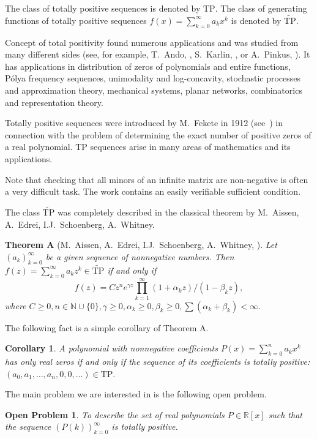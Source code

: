 \documentclass[12pt]{amsart}
\newcounter{count}
\numberwithin{count}{section}
\newtheorem{Corollary}[count]{Corollary}
\newtheorem{Problem}[count]{Open Problem}
\begin{document}
The class of totally positive sequences is denoted by $\mathrm{TP}.$
The class of generating functions of totally positive sequences
$f(x)=\sum_{k=0}^\infty a_k x^k$
is  denoted by  $\widetilde{\mathrm{TP}}.$

Concept of total positivity found numerous applications and was
studied from many different sides (see, for example, T.~Ando, \cite{ando}, 
S.~Karlin,  \cite{tp},  or A.~Pinkus, \cite{pin}).  It has applications  
in distribution of zeros of polynomials and entire functions,  P\'olya 
frequency sequences, unimodality and log-concavity,  stochastic 
processes and approximation theory, mechanical systems,  planar  
networks, combinatorics and representation theory. 


Totally  positive  sequences were introduced
by M.~Fekete in 1912 (see~\cite{fek}) in connection with the problem 
of determining the exact number of positive zeros of a real polynomial. 
$\mathrm{TP}$  sequences arise in many areas of mathematics and its
applications.

Note that checking that all minors of an infinite matrix are non-negative is 
often a very difficult task. The work \cite{kv} contains an easily verifiable 
sufficient condition.

The class $\widetilde{\mathrm{TP}}$ was completely described in the
classical theorem by M.~Aissen, A.~Edrei, I.J.~Schoenberg, A.~Whitney.  

 

{\bf  Theorem A} (M.~Aissen, A.~Edrei, I.J.~Schoenberg, A.~Whitney, \cite{aissen}).
{ \it  Let $(a_k)_{k=0}^\infty$  be a given sequence of nonnegative numbers.  
Then $f(z)=\sum_{k=0}^\infty a_kz^k \in \widetilde{\mathrm{TP}}$ if and
only if
$$f(z)=C z^n e^{\gamma z}\prod_{k=1}^\infty (1+\alpha_kz)/(1-\beta_kz),$$
where $C\ge 0, n\in \mathbb{ N}\cup\{0\},
\gamma\ge0,\alpha_k\ge0,\beta_k\ge0,\sum(\alpha_k+\beta_k)
<\infty.$}

The following fact is a simple corollary of Theorem A. 
 

\begin{Corollary}  A polynomial with nonnegative coefficients 
$P(x) =\sum _{k=0}^n a_k x^k $   has only real zeros if and only 
if the sequence of its coefficients is totally positive: $(a_0,
a_1, \ldots , a_n, 0, 0, \ldots ) \in \mathrm{TP}.$
\end{Corollary}

The main problem we are interested in is the following open problem.
\begin{Problem}
\label{pr1}
To describe the set of real polynomials $P\in \mathbb{R}[x]$ such that
the sequence $(P(k))_{k=0}^\infty$ is totally positive.
\end{Problem}
\end{document}
